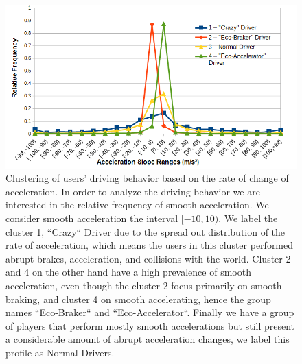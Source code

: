 \documentclass[preprint,authoryear,12pt]{elsarticle}
\begin{document}
\begin{figure}[htb]
	\begin{center}
		\includegraphics[width=1\linewidth]{ijhcs14-img/kmeansclustering}
		\caption{Clustering of users' driving behavior based on the rate of change of acceleration. In order to analyze the driving behavior we are interested in the relative frequency of smooth acceleration. We consider smooth acceleration the interval $[-10,10)$. We label the cluster 1, ``Crazy`` Driver due to the spread out distribution of the rate of acceleration, which means the users in this cluster performed abrupt brakes, acceleration, and collisions with the world.
			Cluster 2 and 4 on the other hand have a high prevalence of smooth acceleration, even though the cluster 2 focus primarily on smooth braking, and cluster 4 on smooth accelerating, hence the group names ``Eco-Braker`` and ``Eco-Accelerator``. Finally we have a group of players that perform mostly smooth accelerations but still present a considerable amount of abrupt acceleration changes, we label this profile as Normal Drivers. \label{fig:accel-ranges}}
	\end{center}
\end{figure}
\end{document}
